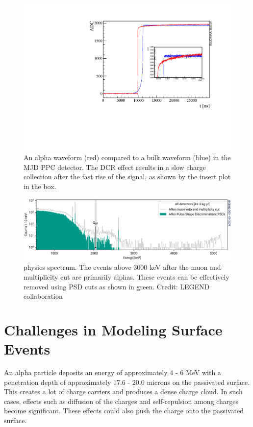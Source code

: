 \begin{figure}[!htb]
\centering
\includegraphics[width=0.9\linewidth]{ch3/figs/dcr_waveform.pdf}
\caption{An alpha waveform (red) compared to a bulk waveform (blue) in the MJD PPC detector. The DCR effect results in a slow charge collection after the fast rise of the signal, as shown by the insert plot in the box.\cite{TUBE_paper}}
\label{fig:dcr_waveform}
\end{figure}

\begin{figure}[!htb]
\centering
  \includegraphics[width=0.99\linewidth]{ch3/figs/l200-phy-spectrum-psd.png}
  \caption{{\Ltwo} physics spectrum. The events above 3000 keV after the muon and multiplicity cut are primarily alphas. These events can be effectively removed using PSD cuts as shown in green. Credit: LEGEND collaboration}
\label{ch3_fig_L200_surface_background}
\end{figure}


\section{Challenges in Modeling Surface Events}
An alpha particle deposits an energy of approximately $4$ - $6$ MeV with a penetration depth of approximately $17.6$ - $20.0$ microns on the passivated surface. This creates a lot of charge carriers and produces a dense charge cloud. In such cases, effects such as diffusion of the charges and self-repulsion among charges become significant. These effects could also push the charge onto the passivated surface. 

